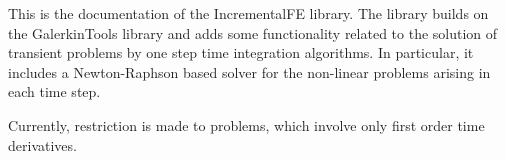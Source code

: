 This is the documentation of the Incremental\+FE library. The library builds on the Galerkin\+Tools library and adds some functionality related to the solution of transient problems by one step time integration algorithms. In particular, it includes a Newton-\/\+Raphson based solver for the non-\/linear problems arising in each time step.

Currently, restriction is made to problems, which involve only first order time derivatives. 